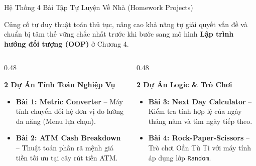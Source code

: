 \documentclass[aspectratio=169, 10pt]{beamer}
\begin{document}
\begin{frame}{Hệ Thống 4 Bài Tập Tự Luyện Về Nhà (Homework Projects)}
  \begin{tcolorbox}[colback=UniLightBlue!30,colframe=UniNavy,title=\textbf{Mục Đích Của Bài Tập Tự Luyện Về Nhà}]
    Củng cố tư duy thuật toán thủ tục, nâng cao khả năng tự giải quyết vấn đề và chuẩn bị tâm thế vững chắc nhất trước khi bước sang mô hình \textbf{Lập trình hướng đối tượng (OOP)} ở Chương 4.
  \end{tcolorbox}
  \begin{columns}[T]
    \begin{column}{0.48\textwidth}
      \begin{block}{\textbf{2 Dự Án Tính Toán Nghiệp Vụ}}
        \begin{itemize}
          \item \textbf{Bài 1: Metric Converter} -- Máy tính chuyển đổi hệ đơn vị đo lường đa năng (Menu lựa chọn).
          \item \textbf{Bài 2: ATM Cash Breakdown} -- Thuật toán phân rã mệnh giá tiền tối ưu tại cây rút tiền ATM.
        \end{itemize}
      \end{block}
    \end{column}
    \begin{column}{0.48\textwidth}
      \begin{exampleblock}{\textbf{2 Dự Án Logic \& Trò Chơi}}
        \begin{itemize}
          \item \textbf{Bài 3: Next Day Calculator} -- Kiểm tra tính hợp lệ của ngày tháng năm và tìm ngày tiếp theo.
          \item \textbf{Bài 4: Rock-Paper-Scissors} -- Trò chơi Oẳn Tù Tì với máy tính áp dụng lớp \texttt{Random}.
        \end{itemize}
      \end{exampleblock}
    \end{column}
  \end{columns}
\end{frame}
\end{document}
